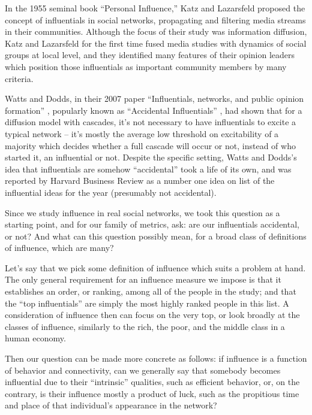 \documentclass[10pt,oneside]{memoir}
\begin{document}
In the 1955 seminal book ``Personal Influence,'' Katz and Lazarsfeld proposed the concept of influentials in social networks, propagating and filtering media streams in their communities.  Although the focus of their study was information diffusion, Katz and Lazarsfeld for the first time fused media studies with dynamics of social groups at local level, and they identified many features of their opinion leaders which position those influentials as important community members by many criteria.


Watts and Dodds, in their 2007 paper ``Influentials, networks, and public opinion formation'' \cite{watts2007influentials}, popularly known as ``Accidental Influentials'' \cite{hbr2007list}, had shown that for a diffusion model with cascades, it's not necessary to have influentials to excite a typical network -- it's mostly the average low threshold on excitability of a majority which decides whether a full cascade will occur or not, instead of who started it, an influential or not.  Despite the specific setting, Watts and Dodds's idea that influentials are somehow ``accidental'' took a life of its own, and was reported by Harvard Business Review as a number one idea on list of the influential ideas for the year (presumably not accidental).


Since we study influence in real social networks, we took this question as a starting point, and for our family of metrics, ask: are our influentials accidental, or not?  And what can this question possibly mean, for a broad class of definitions of influence, which are many?


Let's say that we pick some definition of influence which suits a problem at hand.  The only general requirement for an influence measure we impose is that it establishes an order, or ranking, among all of the people in the study; and that the ``top influentials'' are simply the most highly ranked people in this list.  A consideration of influence then can focus on the very top, or look broadly at the classes of influence, similarly to the rich, the poor, and the middle class in a human economy.


Then our question can be made more concrete as follows: if influence is a function of behavior and connectivity, can we generally say that somebody becomes influential due to their ``intrinsic'' qualities, such as efficient behavior, or, on the contrary, is their influence mostly a product of luck, such as the propitious time and place of that individual's appearance in the network?
\end{document}
